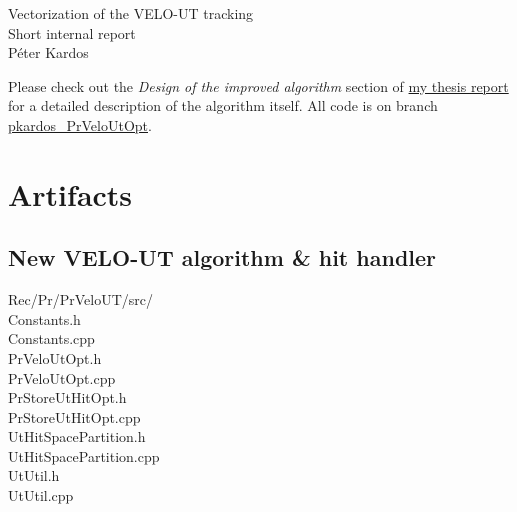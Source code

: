 \documentclass[12pt]{article}
\newcommand\tab[1][.7cm]{\hspace*{#1}}
\begin{document}
\begin{center}
	\Huge Vectorization of the VELO-UT tracking\\
	\Large Short internal report\\
	\vspace{1pc}
	\huge Péter Kardos \\
\end{center}


Please check out the \textit{Design of the improved algorithm} section of \href{https://github.com/petiaccja/UU_CERN_Thesis/blob/master/Report/uu_cern_thesis_report.pdf}{my thesis report} for a detailed description of the algorithm itself. All code is on branch \href{https://gitlab.cern.ch/lhcb/Rec/tree/pkardos_PrVeloUtOpt}{pkardos\_PrVeloUtOpt}.



\section{Artifacts}


\subsection{New VELO-UT algorithm \& hit handler}

\begin{itshape}
    Rec/Pr/PrVeloUT/src/\\
    \tab Constants.h\\
    \tab Constants.cpp\\
    \tab PrVeloUtOpt.h\\
    \tab PrVeloUtOpt.cpp\\
    \tab PrStoreUtHitOpt.h\\
    \tab PrStoreUtHitOpt.cpp\\
    \tab UtHitSpacePartition.h\\
    \tab UtHitSpacePartition.cpp\\
    \tab UtUtil.h\\
    \tab UtUtil.cpp
\end{itshape}

\vspace{1pc}
\end{document}
